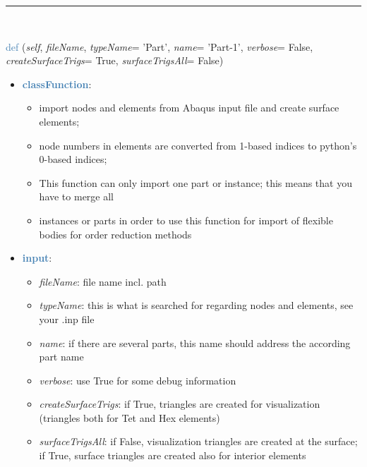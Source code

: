 \begin{itemize}[leftmargin=1.4cm]
\begin{itemize}[leftmargin=1.4cm]
\begin{itemize}[leftmargin=1.4cm]
\begin{itemize}[leftmargin=0.5cm]
\begin{itemize}[leftmargin=1.4cm]
\begin{itemize}[leftmargin=1.4cm]
\begin{itemize}[leftmargin=1.4cm]
\begin{itemize}[leftmargin=0.5cm]
\begin{itemize}[leftmargin=0.7cm]
\vspace{12pt}\end{itemize}
%
\noindent\rule{8cm}{0.75pt}\vspace{1pt} \\ 
\begin{flushleft}
\noindent \textcolor{steelblue}{def {\bf {}}}\label{sec:FEM:FEMinterface:ImportFromAbaqusInputFile}
({\it self}, {\it fileName}, {\it typeName}= 'Part', {\it name}= 'Part-1', {\it verbose}= False, {\it createSurfaceTrigs}= True, {\it surfaceTrigsAll}= False)
\end{flushleft}
\setlength{\itemindent}{0.7cm}
\begin{itemize}[leftmargin=0.7cm]
\item[--]\textcolor{steelblue}{\bf classFunction}: \vspace{-6pt}
\begin{itemize}[leftmargin=1.2cm]
\setlength{\itemindent}{-0.7cm}
\item[]import nodes and elements from Abaqus input file and create surface elements;
\item[]node numbers in elements are converted from 1-based indices to python's 0-based indices;
\item[]This function can only import one part or instance; this means that you have to merge all
\item[]instances or parts in order to use this function for import of flexible bodies for order reduction methods
\end{itemize}
\item[--]\textcolor{steelblue}{\bf input}: \vspace{-6pt}
\begin{itemize}[leftmargin=1.2cm]
\setlength{\itemindent}{-0.7cm}
\item[]{\it fileName}: file name incl. path
\item[]{\it typeName}: this is what is searched for regarding nodes and elements, see your .inp file
\item[]{\it name}: if there are several parts, this name should address the according part name
\item[]{\it verbose}: use True for some debug information
\item[]{\it createSurfaceTrigs}: if True, triangles are created for visualization (triangles both for Tet and Hex elements)
\item[]{\it surfaceTrigsAll}: if False, visualization triangles are created at the surface; if True, surface triangles are created also for interior elements

\end{itemize}
\end{itemize}
\end{itemize}
\end{itemize}
\end{itemize}
\end{itemize}
\end{itemize}
\end{itemize}
\end{itemize}
\end{itemize}
